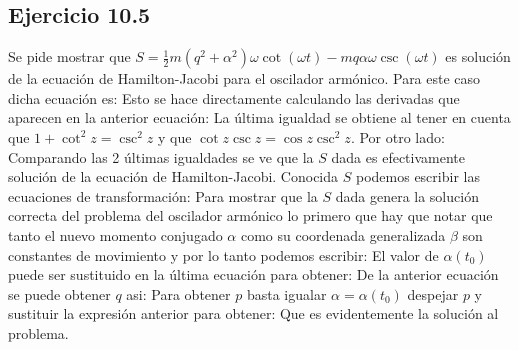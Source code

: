 
\subsection*{Ejercicio 10.5}
Se pide mostrar que  $S=\frac{1}{2} m \left(q^2+\alpha ^2\right) \omega  \cot (\omega t)-m q \alpha  \omega  \csc ( \omega t)$ es soluci\'on de la ecuaci\'on de Hamilton-Jacobi para el oscilador arm\'onico. Para este caso dicha ecuaci\'on es:
Esto se hace directamente calculando las derivadas que aparecen en la anterior ecuaci\'on:
La \'ultima igualdad se obtiene al tener en cuenta que $1+\cot^2 z=\csc^2 z$ y que $\cot z \csc z= \cos z \csc^2 z$. Por otro lado:
Comparando las 2 \'ultimas igualdades se ve que la $S$ dada es efectivamente soluci\'on de la ecuaci\'on de Hamilton-Jacobi.  Conocida $S$ podemos escribir las ecuaciones de transformaci\'on:
Para mostrar que la $S$ dada genera la soluci\'on correcta del problema del oscilador arm\'onico lo primero que hay que notar que tanto el nuevo momento conjugado $\alpha$ como su coordenada generalizada $\beta$ son constantes de movimiento y por lo tanto podemos escribir:
El valor de $\alpha(t_0)$ puede ser sustituido en la \'ultima ecuaci\'on para obtener:
De la anterior ecuaci\'on se puede obtener $q$ asi:
Para obtener $p$ basta igualar $\alpha=\alpha(t_0)$ despejar $p$ y sustituir la expresi\'on anterior para obtener:
Que es evidentemente la soluci\'on al problema.

